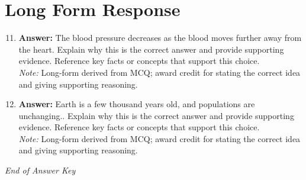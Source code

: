 \documentclass[12pt]{article}
\begin{document}
\section*{Long Form Response}
\begin{enumerate}[label=\arabic*.]
\setcounter{enumi}{10}
\item \textbf{Answer:} The blood pressure decreases as the blood moves further away from the heart. Explain why this is the correct answer and provide supporting evidence. Reference key facts or concepts that support this choice.
\\ \textit{Note:} Long-form derived from MCQ; award credit for stating the correct idea and giving supporting reasoning.
\item \textbf{Answer:} Earth is a few thousand years old, and populations are unchanging.. Explain why this is the correct answer and provide supporting evidence. Reference key facts or concepts that support this choice.
\\ \textit{Note:} Long-form derived from MCQ; award credit for stating the correct idea and giving supporting reasoning.
\end{enumerate}

\vfill
\noindent\textit{End of Answer Key}
\end{document}
